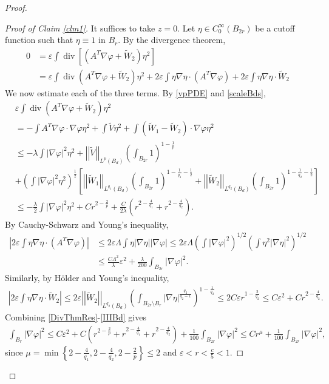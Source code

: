 \documentclass[12pt,reqno]{amsart}
\theoremstyle{plain}
\theoremstyle{definition}
\DeclareMathOperator{\di}{div}
\newcommand{\eps}{\varepsilon}
\newcommand{\vp}{\varphi}
\newcommand{\la}{\lambda}
\newcommand{\La}{\Lambda}
\newcommand{\iny}{\infty}
\newcommand{\gr}{\nabla}
\newcommand{\norm}[1]{\left\vert \left\vert #1\right\vert\right\vert}
\newcommand{\abs}[1]{\left\vert#1\right\vert}
\newcommand{\set}[1]{\left\{#1\right\}}
\newcommand{\brac}[1]{\left[#1\right]}
\newcommand{\pr}[1]{\left( #1 \right) }
\begin{document}
\begin{proof}
\begin{proof}[Proof of Claim \ref{clm1}]
It suffices to take $z = 0$.
Let $\eta \in C^\iny_0\pr{B_{2r}}$ be a cutoff function such that $\eta \equiv 1$ in $B_r$.
By the divergence theorem,
\begin{align}
0 &= \eps \int \di \brac{\pr{A^T \gr \vp + \widetilde W_2} \eta^2} \nonumber \\
&= \eps \int \di \pr{A^T \gr \vp + \widetilde W_2} \eta^2
+2 \eps \int \eta \gr \eta \cdot \pr{A^T \gr \vp}
+2 \eps \int \eta \gr \eta \cdot \widetilde W_2
\label{DivThmRes}
\end{align}
We now estimate each of the three terms.
By \eqref{vpPDE} and \eqref{scaleBds},
\begin{align}
 &\eps \int \di \pr{A^T \gr \vp + \widetilde W_2} \eta^2 \nonumber \\
 &=- \int A^T \gr \vp \cdot \gr \vp\eta^2 
 + \int \widetilde V \eta^2 
+ \int \pr{\widetilde W_1 - \widetilde W_2} \cdot \gr \vp \eta^2 \nonumber \\
 &\le - \la \int \abs{\gr \vp}^2 \eta^2 
 + \norm{\widetilde V}_{L^p\pr{B_d}} \pr{\int_{B_{2r}} 1 }^{1 - \frac 1 p} \nonumber \\
&+ \pr{\int \abs{\gr \vp}^2 \eta^2 }^{\frac 1 2}\brac{ \norm{\widetilde W_1}_{L^{q_1}\pr{B_d}} \pr{\int_{B_{2r}} 1 }^{1 - \frac 1 {q_1} - \frac 1 2}
 + \norm{\widetilde W_2}_{L^{q_2}\pr{B_d}} \pr{\int_{B_{2r}} 1 }^{1 - \frac 1 {q_2} - \frac 1 2}}\nonumber \\
&\le - \frac{\la}{2} \int \abs{\gr \vp}^2 \eta^2 
 + C r^{2 - \frac 2 p}
+ \frac{C}{2 \la} \pr{r^{2 - \frac 4 {q_1}} + r^{2 - \frac 4 {q_2}}}.
\label{IBd}
\end{align}
By Cauchy-Schwarz and Young's inequality,
\begin{align}
\abs{2 \eps \int \eta \gr \eta \cdot \pr{A^T \gr \vp} } 
&\le 2 \eps \La \int \eta \abs{\gr \eta} \abs{\gr \vp}
\le 2 \eps \La \pr{ \int \abs{\gr \vp}^2 }^{1/2} \pr{ \int \eta^2  \abs{\gr \eta}^2 }^{1/2} \nonumber \\
&\le \frac{C \La^2}{\la} \eps^2 + \frac{\la}{200} \int_{B_{2r}} \abs{\gr \vp}^2.
\label{IIBd}
\end{align}
Similarly, by H\"older and Young's inequality,
\begin{align}
\abs{2 \eps \int \eta \gr \eta \cdot \widetilde W_2}
\le 2 \eps \norm{\widetilde W_2}_{L^{q_2}\pr{B_d}} \pr{\int_{B_{2r}\setminus B_r}  \abs{\gr \eta}^{\frac{q_2}{q_2-1}}}^{1 - \frac 1 {q_2}} 
\le 2 C \eps r^{1 - \frac 2 {q_2}}
\le C \eps^2 + C r^{2 - \frac 4 {q_2}}.
\label{IIIBd}
\end{align}
Combining \eqref{DivThmRes}-\eqref{IIIBd} gives
\begin{align}
\int_{B_r} \abs{\gr \vp}^2 
\le C \eps^2 
+C\pr{ r^{2 - \frac 2 p} + r^{2 - \frac 4 {q_1}} + r^{2 - \frac 4 {q_2}} }
+ \frac{1}{100} \int_{B_{2r}} \abs{\gr \vp}^2
\le C r^\mu
+ \frac{1}{100} \int_{B_{2r}} \abs{\gr \vp}^2,
\label{combinedEst}
\end{align}
since $\mu = \min\set{2 - \frac 4 {q_1}, 2 - \frac 4 {q_2}, 2 - \frac 2 p} \le 2$ and $\eps < r < \frac c 5 < 1$.


\end{proof}
\end{proof}
\end{document}
